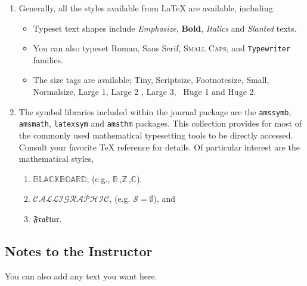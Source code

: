 \begin{enumerate}
 \item Generally, all the styles available from \LaTeX{} are available, including:
       \begin{itemize}
        \item Typeset text shapes include \emph{Emphasize}, \textbf{Bold},
              \textit{Italics} and \textsl{Slanted} texts.
        \item You can also typeset \textrm{Roman}, \textsf{Sans Serif}, \textsc{Small Caps}, and
              \texttt{Typewriter} families.
        \item The size tags are available;  {\tiny Tiny},
              {\scriptsize Scriptsize}, {\footnotesize Footnotesize}, {\small Small}, {\normalsize
               Normalsize}, {\large Large 1}, {\Large Large 2 }, {\LARGE Large 3}, \ {\huge Huge 1} and {\Huge
              Huge 2}.

       \end{itemize}

 \item The symbol libraries included within the journal package are the
       \texttt{amssymb}, \texttt{amsmath}, \texttt{latexsym} and \texttt{amsthm} packages.
       This collection provides for most of the commonly used mathematical typesetting tools to be
       directly accessed. Consult your favorite \TeX{} reference for details.   Of particular interest
       are the mathematical styles,
       \begin{enumerate}
        \item $\mathbb{BLACKBOARD}$, (e.g., $\mathbb{R}\,$,$\mathbb{Z}\,$,$\mathbb{C}$).
        \item $\mathcal{CALLIGRAPHIC}$, (e.g. $\mathcal{S}= \emptyset$), and
        \item $\mathfrak{Fraktur}$.
       \end{enumerate}



\end{enumerate}


\backmatter

\begin{annotation}
 \chapter{Notes to the Instructor}

 \renewcommand\notesname{}
 \vspace{-2cm}
 \begingroup
 \setlength{\parskip}{2ex}
 \renewcommand{\enotesize}{\normalsize}
 \theendnotes
 \endgroup
\end{annotation}

\vspace{.1in}

You can also add any text you want here.



